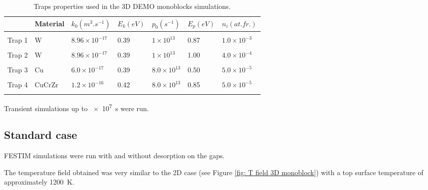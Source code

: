 \begin{table}
    \centering
    \begin{tabular}{L{1.5cm} L{1.5cm} R{1.6cm} R{1.1cm} R{1.6cm} R{1.1cm} R{2cm}}
         & Material & $k_0 (\si{m^3.s^{-1}})$ &  $E_k (\si{eV})$ & $p_0 (\si{s^{-1}})$ & $E_p (\si{eV})$ & $n_i (\si{at.fr.})$ \\
        \hline
        \\
        Trap 1 & W & $8.96 \times 10^{-17}$ & 0.39 & $1 \times 10^{13}$& 0.87 & $1.0 \times 10^{-3}$ \\
        \\
        Trap 2 & W & $8.96 \times 10^{-17}$ & 0.39 & $1 \times 10^{13}$& 1.00 & $4.0 \times 10^{-4}$ \\
        \\
        Trap 3 & Cu & $6.0 \times 10^{-17}$ & 0.39 & $8.0 \times 10^{13}$ & 0.50 &$5.0 \times 10^{-5}$\\
        \\
        Trap 4 & CuCrZr & $1.2\times 10^{-16}$ & 0.42 & $8.0 \times 10^{13}$ & 0.85 &$5.0 \times 10^{-5}$\\
        \\
    \end{tabular}
    \caption{Traps properties used in the 3D DEMO monoblocks simulations.}
    \label{tab:traps monoblock DEMO}
\end{table}

Transient simulations up to \SI{e7}{s} were run.

\subsection{Standard case}

FESTIM simulations were run with and without desorption on the gaps.


The temperature field obtained was very similar to the 2D case (see Figure \ref{fig: T field 3D monoblock}) with a top surface temperature of approximately \SI{1200}{K}.

